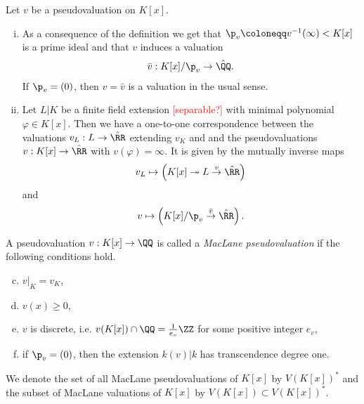 \begin{remark}
    Let $v$ be a pseudovaluation on $K[x]$.
    \begin{enumerate} [(i)]
        \item As a consequence of the definition we get that $\p_v \coloneqq v^{-1}(\infty) < K[x]$ is a prime ideal
            and that $v$ induces a valuation 
            \begin{align}
                \bar{v}: K[x]/\p_v \to \hat{\QQ}.
            \end{align}
            If $\p_v = (0)$, then $v=\bar{v}$ is a valuation in the usual sense.
        \item Let $L|K$ be a finite field extension \textcolor{red}{[separable?]} with minimal polynomial $\varphi \in K[x]$.
            Then we have a one-to-one correspondence between the valuations $v_L: L \to \hat{\RR}$ extending $v_K$ and 
            and the pseudovaluations $v: K[x] \to \hat{\RR}$ with $v(\varphi)=\infty$.
            It is given by the mutually inverse maps
            \begin{align}
                v_L \mapsto \left( K[x] \twoheadrightarrow L \overset{v}{\to} \hat{\RR} \right)
            \end{align}
            and
            \begin{align}
                v \mapsto \left(K[x]/\p_v \overset{\bar{v}}{\to} \hat{\RR}\right).
            \end{align}
    \end{enumerate}
\end{remark}

\begin{definition}
    A pseudovaluation $v: K[x] \to \QQ$ is called a \textit{MacLane pseudovaluation} if the following conditions hold.
    \begin{enumerate}[(a)]
        \setcounter{enumi}{2}
        \item $v|_K = v_K$,
        \item $v(x) \geq 0$,
        \item $v$ is discrete, i.e. $v(K[x]) \cap \QQ = \frac{1}{e_v}\ZZ$ for some positive integer $e_v$,
        \item if $\p_v = (0)$, then the extension $k(v)|k$ has transcendence degree one.
    \end{enumerate}
    We denote the set of all MacLane pseudovaluations of $K[x]$ by $V(K[x])^*$ and the subset of MacLane valuations of $K[x]$ by $V(K[x]) \subset V(K[x])^*$.
\end{definition}

